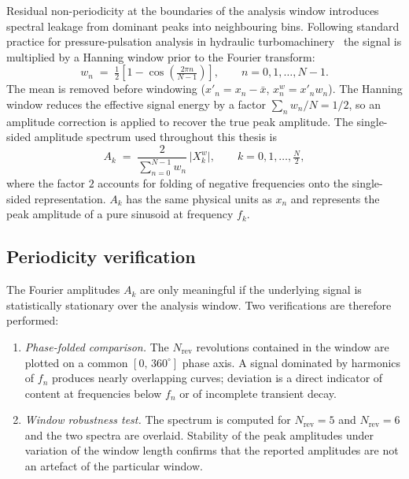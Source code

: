 Residual non-periodicity at the boundaries of the analysis window
introduces spectral leakage from dominant peaks into neighbouring
bins. Following standard practice for pressure-pulsation analysis
in hydraulic turbomachinery~\cite{Kerlefsen2025,Bergan2018} the signal is
multiplied by a Hanning window prior to the Fourier transform:
\begin{equation}
    w_n \;=\; \tfrac{1}{2}\!\left[ 1 - \cos\!\left(\tfrac{2\pi n}{N-1}\right)\right],
    \qquad n = 0,1,\dots,N-1. \label{eq:hanning}
\end{equation}
The mean is removed before windowing ($x'_n = x_n - \bar{x}$,
$x^{w}_n = x'_n w_n$). The Hanning window reduces the effective
signal energy by a factor $\sum_n w_n / N = 1/2$, so an amplitude
correction is applied to recover the true peak amplitude. The
single-sided amplitude spectrum used throughout this thesis is
\begin{equation}
    A_k \;=\; \frac{2}{\displaystyle\sum_{n=0}^{N-1} w_n}\,
      \bigl|X^{w}_k\bigr|,
    \qquad k = 0,1,\dots,\tfrac{N}{2}, \label{eq:amplitude}
\end{equation}
where the factor $2$ accounts for folding of negative frequencies
onto the single-sided representation. $A_k$ has the same physical
units as $x_n$ and represents the peak amplitude of a pure sinusoid
at frequency $f_k$.
 
\subsection{Periodicity verification}
\label{sec:spec-periodicity}
 
The Fourier amplitudes $A_k$ are only meaningful if the underlying
signal is statistically stationary over the analysis window. Two
verifications are therefore performed:
\begin{enumerate}
  \item \emph{Phase-folded comparison.} The $N_{\mathrm{rev}}$
        revolutions contained in the window are plotted on a common
        $[0,\,360^\circ]$ phase axis. A signal dominated by harmonics
        of $f_n$ produces nearly overlapping curves; deviation is a
        direct indicator of content at frequencies below $f_n$ or of
        incomplete transient decay.
  \item \emph{Window robustness test.} The spectrum is computed for
        $N_{\mathrm{rev}} = 5$ and $N_{\mathrm{rev}} = 6$ and the
        two spectra are overlaid. Stability of the peak amplitudes
        under variation of the window length confirms that the
        reported amplitudes are not an artefact of the particular
        window.
\end{enumerate}
 
